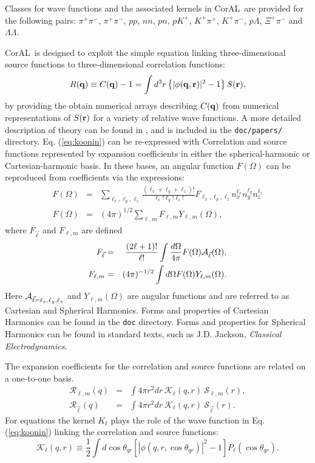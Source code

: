 \documentclass[10pt]{article}
\newcommand{\coral}{CorAL}
\begin{document}
Classes for wave functions and the associated kernels in \coral\ are provided for the following pairs: $\pi^+\pi^-$, $\pi^+\pi^-$, $pp$, $nn$, $pn$, $pK^+$, $K^+\pi^+$, $K^+\pi^-$, $p\Lambda$, $\Xi^+\pi^-$ and $\Lambda\Lambda$. 

\coral\ is designed to exploit the simple equation linking three-dimensional source functions to three-dimensional correlation functions:
\begin{equation}
\label{eq:koonin}
R({\bf q})\equiv C({\bf q})-1=\int d^3r \left\{|\phi({\bf q},{\bf r})|^2-1\right\} S({\bf r}),
\end{equation}
by providing the obtain numerical arrays describing $C({\bf q})$ from numerical representations of $S({\bf r})$ for a variety of relative wave functions. A more detailed description of theory can be found in \cite{Lisa:2005dd}, and is included in the {\tt doc/papers/} directory. Eq. (\ref{eq:koonin}) can be re-expressed with Correlation and source functions represented by expansion coefficients in either the spherical-harmonic or Cartesian-harmonic basis. In these bases, an angular function $F(\Omega)$ can be  reproduced from coefficients via the expressions:
\begin{eqnarray}
F(\Omega)&=&\sum_{\ell_x,\ell_y,\ell_z} \frac{(\ell_x+\ell_y+\ell_z)!}
{\ell_x!\ell_y!\ell_z!} F_{\ell_x,\ell_y,\ell_z}
n_x^{\ell_x}n_y^{\ell_y}n_z^{\ell_z}\\
F(\Omega)&=&(4\pi)^{1/2}\sum_{\ell,m}F_{\ell,m}Y_{\ell,m}(\Omega),
\end{eqnarray}
where $F_{\vec\ell}$ and $F_{\ell,m}$ are defined
\begin{eqnarray}
F_{\vec{\ell}}&=&\frac{(2\ell+1)!}{\ell !}\int\frac{d\Omega}{4\pi}
F(\Omega){\cal A}_{\vec{\ell}}(\Omega),\\
F_{\ell,m}&=&(4\pi)^{-1/2}\int d\Omega F(\Omega) Y_{\ell,m}(\Omega).
\end{eqnarray}
Here ${\cal A}_{\vec{\ell}=\ell_x,\ell_y,\ell_z}$ and $Y_{\ell,m}(\Omega)$ are angular functions and are referred to as Cartesian and Spherical Harmonics. Forms and properties of Cartesian Harmonics can be found in the {\tt doc} directory. Forms and properties for Spherical Harmonics can be found in standard texts, such as J.D. Jackson, {\it Classical Electrodynamics}. 

The expansion coefficients for the correlation and source functions are related on a one-to-one basis.
\begin{eqnarray}
{\mathcal R}_{\ell,m}(q)&=&\int 4\pi r^2dr~
{\mathcal K}_\ell(q,r)~{\mathcal S}_{\ell,m}(r),\\
{\mathcal R}_{\vec{\ell}}(q)
&=&\int 4\pi r^2dr~{\mathcal K}_\ell(q,r)
~{\mathcal S}_{\vec{\ell}}(r).
\end{eqnarray}
For equations the kernel $K_{\ell}$ plays the role of the wave function in Eq. (\ref{eq:koonin}) linking the correlation and source functions:
\begin{equation}
{\mathcal K}_\ell(q,r)\equiv\frac{1}{2}\int d\cos\theta_{qr} \left[
|\phi(q,r,\cos\theta_{qr})|^2-1\right] P_\ell(\cos\theta_{qr}).
\end{equation}
\end{document}
